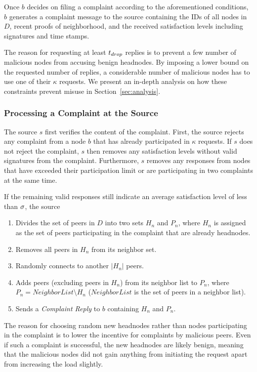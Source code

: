 Once $b$ decides on filing a complaint according to the aforementioned conditions, $b$ generates a complaint message to the source containing the IDs of all nodes in $D$, recent proofs of neighborhood,  and the received satisfaction levels including signatures and time stamps.  


The reason for requesting at least $t_{drop}$ replies is to prevent a few number of malicious nodes from accusing benign headnodes. By imposing a lower bound on the requested number of replies, a considerable number of malicious nodes has to use one of their $\kappa$ requests. We present an in-depth analysis on how these constraints prevent misuse in Section~\ref{sec:analysis}. 





\subsubsection*{Processing a Complaint at the Source}

The source $s$ first verifies the content of the complaint. First, the source rejects any complaint from a node $b$ that has already participated in $\kappa$ requests. 
If $s$ does not reject the complaint, $s$ then removes any satisfaction levels without valid signatures from the complaint.
Furthermore, $s$ removes any responses from nodes that have exceeded their participation limit or are participating in two complaints at the same time. 

If the remaining valid responses still indicate an average satisfaction level of less than $\sigma$, the source 
\begin{enumerate}
 \item Divides the set of peers in $D$ into two sets $H_n$ and $P_n$, where $H_n$ is assigned as the set of peers participating in the complaint that are already headnodes. 
 \item Removes all peers in $H_n$ from its neighbor set.
 \item Randomly connects to another $|H_n|$ peers. 
 \item Adds peers (excluding peers in $H_n$) from its neighbor list to $P_n$, where $P_n = NeighborList\setminus H_n$ ($NeighborList$ is the set of peers in a neighbor list). 
 \item Sends a \textit{Complaint Reply} to $b$ containing $H_n$ and $P_n$.
\end{enumerate}
 The reason for choosing random new headnodes rather than nodes participating in the complaint is to lower the incentive for complaints by malicious peers. Even if such a complaint is successful, the new headnodes are likely benign, meaning that the malicious nodes did not gain anything from initiating the request apart from increasing the load slightly. 


